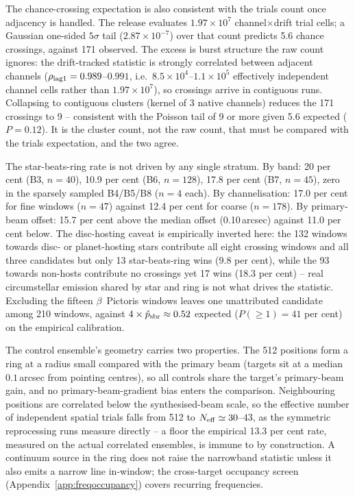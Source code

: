 \documentclass{openjournal}
\begin{document}
The chance-crossing expectation is also consistent with the trials
count once adjacency is handled. The release evaluates
$1.97\times10^{7}$ channel$\times$drift trial cells; a Gaussian
one-sided $5\sigma$ tail ($2.87\times10^{-7}$) over that count
predicts 5.6 chance crossings, against 171 observed. The excess is
burst structure the raw count ignores: the drift-tracked statistic is
strongly correlated between adjacent channels
($\rho_{\rm lag1}=0.989$--$0.991$, i.e.\
$8.5\times10^{4}$--$1.1\times10^{5}$ effectively independent channel
cells rather than $1.97\times10^{7}$), so crossings arrive in
contiguous runs. Collapsing to contiguous clusters (kernel of 3
native channels) reduces the 171 crossings to 9 -- consistent with
the Poisson tail of 9 or more given 5.6 expected ($P=0.12$). It is
the cluster count, not the raw count, that must be compared with the
trials expectation, and the two agree.

The star-beats-ring rate is not driven by any single stratum. By
band: 20 per cent (B3, $n=40$), 10.9 per cent (B6, $n=128$), 17.8 per
cent (B7, $n=45$), zero in the sparsely sampled B4/B5/B8 ($n=4$
each). By channelisation: 17.0 per cent for fine windows ($n=47$)
against 12.4 per cent for coarse ($n=178$). By primary-beam offset:
15.7 per cent above the median offset (0.10\,arcsec) against 11.0 per
cent below. The disc-hosting caveat is empirically inverted here: the
132 windows towards disc- or planet-hosting stars contribute all
eight crossing windows and all three candidates but only 13
star-beats-ring wins (9.8 per cent), while the 93 towards non-hosts
contribute no crossings yet 17 wins (18.3 per cent) -- real
circumstellar emission shared by star and ring is not what drives the
statistic. Excluding the fifteen $\beta$~Pictoris windows leaves one
unattributed candidate among 210 windows, against
$4\times\hat{p}_{\rm sbr}\approx0.52$ expected ($P(\geq1)=41$ per
cent) on the empirical calibration.

The control ensemble's geometry carries two properties. The 512
positions form a ring at a radius small compared with the primary
beam (targets sit at a median $0.1$\,arcsec from pointing centres),
so all controls share the target's primary-beam gain, and no
primary-beam-gradient bias enters the comparison. Neighbouring
positions are correlated below the synthesised-beam scale, so the
effective number of independent spatial trials falls from 512 to
$N_{\rm eff}\simeq30$--$43$, as the symmetric reprocessing runs
measure directly -- a floor the empirical 13.3 per cent rate,
measured on the actual correlated ensembles, is immune to by
construction. A continuum source in the ring does not raise the
narrowband statistic unless it also emits a narrow line in-window;
the cross-target occupancy screen (Appendix~\ref{app:freqoccupancy}) covers
recurring frequencies.
\end{document}
